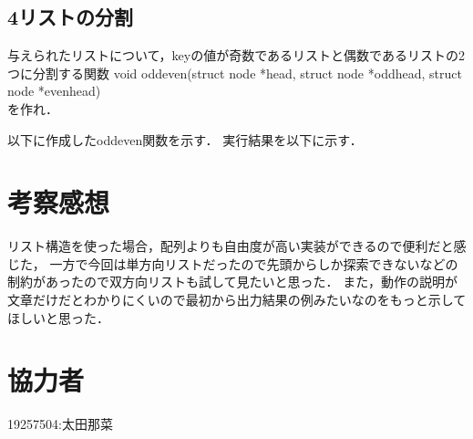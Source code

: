 \documentclass[titlepage]{jarticle}
\begin{document}
\subsection*{4リストの分割}
与えられたリストについて，keyの値が奇数であるリストと偶数であるリストの2つに分割する関数
void oddeven(struct node *head, struct node *oddhead, struct node *evenhead)
\\を作れ．

以下に作成したoddeven関数を示す．
実行結果を以下に示す．
\section*{考察感想}
リスト構造を使った場合，配列よりも自由度が高い実装ができるので便利だと感じた，
一方で今回は単方向リストだったので先頭からしか探索できないなどの制約があったので双方向リストも試して見たいと思った．
また，動作の説明が文章だけだとわかりにくいので最初から出力結果の例みたいなのをもっと示してほしいと思った．
\section*{協力者}
19257504:太田那菜
\end{document}
